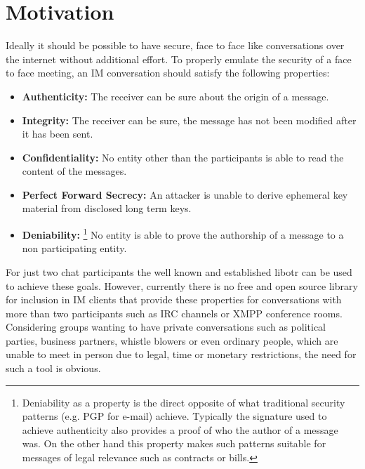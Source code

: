 \section{Motivation}

Ideally it should be possible to have secure, face to face
like conversations over the internet without additional effort. To properly
emulate the security of a face to face meeting, an IM conversation should
satisfy the following properties:

\begin{itemize}

	\item{\textbf{Authenticity:} The receiver can be sure about the origin of a
		message.}

	\item{\textbf{Integrity:} The receiver can be sure, the message has not been
		modified after it has been sent.}

	\item{\textbf{Confidentiality:} No entity other than the participants is
		able to read the content of the messages.}

	\item{\textbf{Perfect Forward Secrecy:} An attacker is unable to derive
		ephemeral key material from disclosed long term keys.}

	\item{\textbf{Deniability:} \footnote{Deniability as a property is the
		direct opposite of what traditional security patterns (e.g. PGP for
e-mail) achieve. Typically the signature used to achieve authenticity also
provides a proof of who the author of a message was. On the other hand this
property makes such patterns suitable for messages of legal relevance such as
contracts or bills.} No entity is able to prove the authorship of a message to a
non participating entity.}

\end{itemize}

For just two chat participants the well known and established libotr can be used
to achieve these goals. However, currently there is no free and open source
library for inclusion in IM clients that provide these properties for
conversations with more than two participants such as IRC channels or XMPP
conference rooms. Considering groups wanting to have private conversations such
as political parties, business partners, whistle blowers or even ordinary people, which are unable to
meet in person due to legal, time or monetary restrictions, the need for such a
tool is obvious.


